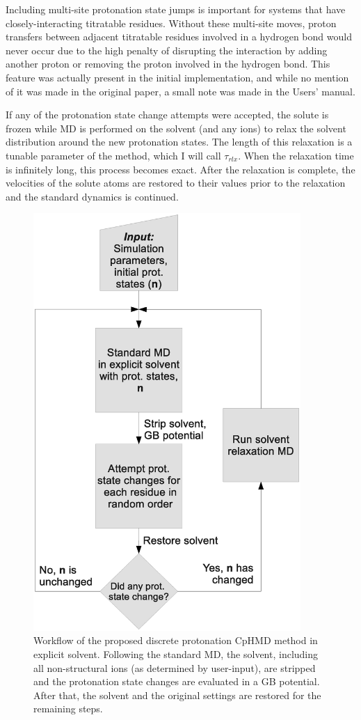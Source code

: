 Including multi-site protonation state jumps is important for systems that have
closely-interacting titratable residues. Without these multi-site moves,
proton transfers between adjacent titratable residues involved in a hydrogen
bond would never occur due to the high penalty of disrupting the interaction by
adding another proton or removing the proton involved in the hydrogen bond. This
feature was actually present in the initial implementation, and while no mention
of it was made in the original paper, a small note was made in the Users'
manual.  \cite{Mongan_JComputChem_2004_v25_p2038}

If any of the protonation state change attempts were accepted, the solute is
frozen while MD is performed on the solvent (and any ions) to relax the solvent
distribution around the new protonation states.  The length of this relaxation
is a tunable parameter of the method, which I will call $\tau_{rlx}$. When the
relaxation time is infinitely long, this process becomes exact. After the
relaxation is complete, the velocities of the solute atoms are restored to
their values prior to the relaxation and the standard dynamics is continued.

\begin{figure}
   \includegraphics[width=4in]{CpHMD_Workflow.eps}
   \caption{Workflow of the proposed discrete protonation CpHMD method in
            explicit solvent. Following the standard MD, the solvent, including
            all non-structural ions (as determined by user-input), are stripped
            and the protonation state changes are evaluated in a GB potential.
            After that, the solvent and the original settings are restored for
            the remaining steps.}
   \label{fig4:workflow}
\end{figure}

